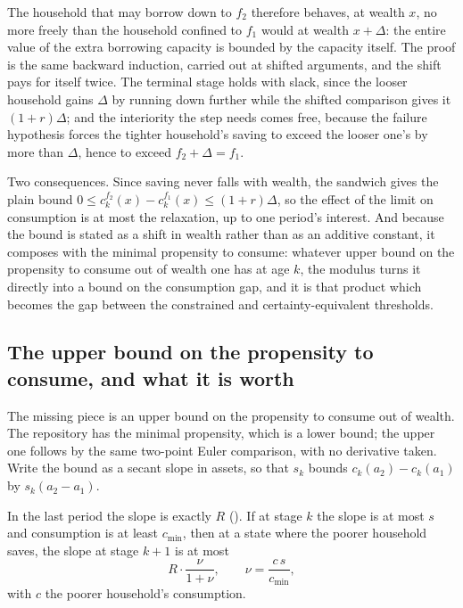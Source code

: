 The household that may borrow down to $f_2$ therefore behaves, at wealth $x$, no more freely than
the household confined to $f_1$ would at wealth $x+\Delta$: the entire value of the extra
borrowing capacity is bounded by the capacity itself. The proof is the same backward induction,
carried out at shifted arguments, and the shift pays for itself twice. The terminal stage holds
with slack, since the looser household gains $\Delta$ by running down further while the shifted
comparison gives it $(1+r)\Delta$; and the interiority the step needs comes free, because the
failure hypothesis forces the tighter household's saving to exceed the looser one's by more than
$\Delta$, hence to exceed $f_2+\Delta=f_1$.

Two consequences. Since saving never falls with wealth, the sandwich gives the plain bound
$0\le c^{f_2}_k(x)-c^{f_1}_k(x)\le(1+r)\Delta$, so the effect of the limit on consumption is at
most the relaxation, up to one period's interest. And because the bound is stated as a shift in
wealth rather than as an additive constant, it composes with the minimal propensity to consume:
whatever upper bound on the propensity to consume out of wealth one has at age $k$, the modulus
turns it directly into a bound on the consumption gap, and it is that product which becomes the
gap between the constrained and certainty-equivalent thresholds. \subsection{The upper bound on the propensity to consume, and what it is worth}

The missing piece is an upper bound on the propensity to consume out of wealth. The repository has
the minimal propensity, which is a lower bound; the upper one follows by the same two-point Euler
comparison, with no derivative taken. Write the bound as a secant slope in assets, so that $s_k$
bounds $c_k(a_2)-c_k(a_1)$ by $s_k(a_2-a_1)$.

\begin{theorem}\label{thm:mpc}
In the last period the slope is exactly $R$ (). If at stage $k$
the slope is at most $s$ and consumption is at least $c_{\min}$, then at a state where the poorer
household saves, the slope at stage $k+1$ is at most
\[
  R\cdot\frac{\nu}{1+\nu},\qquad \nu=\frac{c\,s}{c_{\min}},
\]
with $c$ the poorer household's consumption.
\end{theorem}

